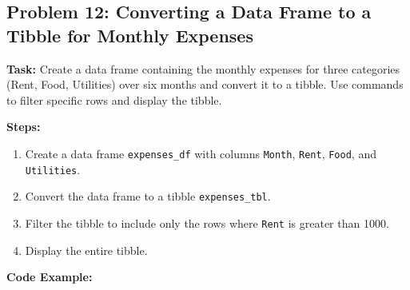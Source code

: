 \documentclass[
  letterpaper,
  DIV=11,
  numbers=noendperiod]{scrreprt}
\providecommand{\tightlist}{%
  \setlength{\itemsep}{0pt}\setlength{\parskip}{0pt}}\usepackage{longtable,booktabs,array}
\begin{document}
\subsection*{Problem 12: Converting a Data Frame to a Tibble for Monthly
Expenses}\label{problem-12-converting-a-data-frame-to-a-tibble-for-monthly-expenses}

\textbf{Task:} Create a data frame containing the monthly expenses for
three categories (Rent, Food, Utilities) over six months and convert it
to a tibble. Use commands to filter specific rows and display the
tibble.

\textbf{Steps:}

\begin{enumerate}
\def\labelenumi{\arabic{enumi}.}
\tightlist
\item
  Create a data frame \texttt{expenses\_df} with columns \texttt{Month},
  \texttt{Rent}, \texttt{Food}, and \texttt{Utilities}.
\item
  Convert the data frame to a tibble \texttt{expenses\_tbl}.
\item
  Filter the tibble to include only the rows where \texttt{Rent} is
  greater than 1000.
\item
  Display the entire tibble.
\end{enumerate}

\textbf{Code Example:}
\end{document}
